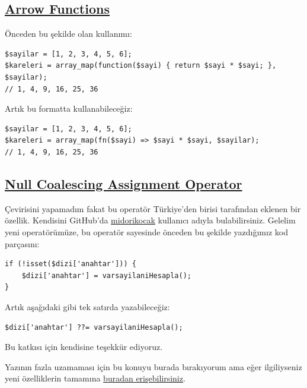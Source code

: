 \documentclass[11pt]{article}
\begin{document}
\subsection{\href{https://wiki.php.net/rfc/arrow\_functions\_v2}{Arrow Functions}}
\label{sec:org6789617}
Önceden bu şekilde olan kullanımı:

\begin{verbatim}
$sayilar = [1, 2, 3, 4, 5, 6];
$kareleri = array_map(function($sayi) { return $sayi * $sayi; }, $sayilar);
// 1, 4, 9, 16, 25, 36
\end{verbatim}

Artık bu formatta kullanabileceğiz:
\begin{verbatim}
$sayilar = [1, 2, 3, 4, 5, 6];
$kareleri = array_map(fn($sayi) => $sayi * $sayi, $sayilar);
// 1, 4, 9, 16, 25, 36
\end{verbatim}
\subsection{\href{https://wiki.php.net/rfc/null\_coalesce\_equal\_operator}{Null Coalescing Assignment Operator}}
\label{sec:org2a8d0b4}
Çevirisini yapamadım fakat bu operatör Türkiye'den birisi tarafından eklenen
bir özellik. Kendisini GitHub'da \href{https://github.com/midorikocak}{midorikocak} kullanıcı adıyla
bulabilirsiniz. Gelelim yeni operatörümüze, bu operatör sayesinde önceden bu
şekilde yazdığımız kod parçasını:

\begin{verbatim}
if (!isset($dizi['anahtar'])) {
    $dizi['anahtar'] = varsayilaniHesapla();
}
\end{verbatim}

Artık aşağıdaki gibi tek satırda yazabileceğiz:
\begin{verbatim}
$dizi['anahtar'] ??= varsayilaniHesapla();
\end{verbatim}

Bu katkısı için kendisine teşekkür ediyoruz.

Yazının fazla uzamaması için bu konuyu burada bırakıyorum ama eğer
ilgiliyseniz yeni özelliklerin tamamına \href{https://github.com/php/php-src/blob/php-7.4.0beta1/UPGRADING}{buradan erişebilirsiniz}.
\end{document}
